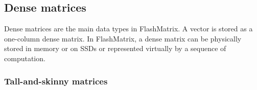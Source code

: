 

\subsection{Dense matrices}
Dense matrices are the main data types in FlashMatrix. A vector is stored
as a one-column dense matrix. In FlashMatrix, a dense matrix can be physically
stored in memory or on SSDs or represented virtually by a sequence of computation.


\subsubsection{Tall-and-skinny matrices} \label{sec:tas_mat}

